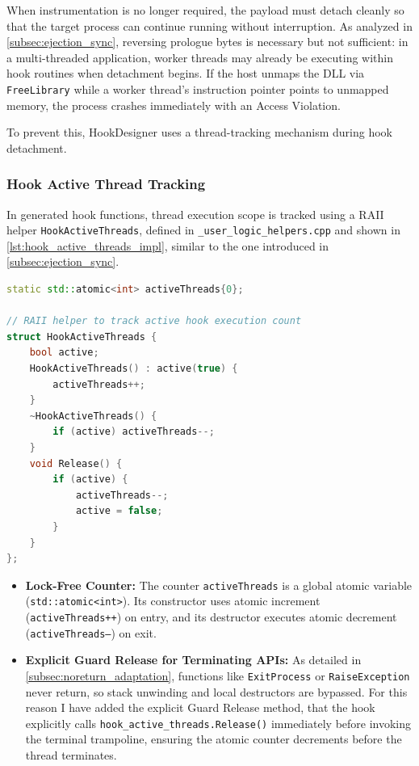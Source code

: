 When instrumentation is no longer required, the payload must detach cleanly so that the target process can continue running without interruption.
As analyzed in \cref{subsec:ejection_sync}, reversing prologue bytes is necessary but not sufficient: in a multi-threaded application, worker threads may already be executing within hook routines when detachment begins.
If the host unmaps the \ac{DLL} via \texttt{FreeLibrary} while a worker thread's instruction pointer points to unmapped memory, the process crashes immediately with an Access Violation.

To prevent this, HookDesigner uses a thread-tracking mechanism during hook detachment.

\subsubsection{Hook Active Thread Tracking}
\label{subsubsec:active_def}

In generated hook functions, thread execution scope is tracked using a RAII helper \texttt{HookActiveThreads}, defined in \texttt{\_user\_logic\_helpers.cpp} and shown in \cref{lst:hook_active_threads_impl}, similar to the one introduced in \cref{subsec:ejection_sync}.

\begin{lstlisting}[language=C++, caption={HookDesigner implementation of active thread tracking in \texttt{\_user\_logic\_helpers.cpp}.}, label={lst:hook_active_threads_impl}, basicstyle=\ttfamily\footnotesize, breaklines=true]
static std::atomic<int> activeThreads{0};

// RAII helper to track active hook execution count
struct HookActiveThreads {
    bool active;
    HookActiveThreads() : active(true) { 
        activeThreads++; 
    }
    ~HookActiveThreads() { 
        if (active) activeThreads--; 
    }
    void Release() {
        if (active) {
            activeThreads--;
            active = false;
        }
    }
};
\end{lstlisting}

\begin{itemize}
	\item \textbf{Lock-Free Counter:} The counter \texttt{activeThreads} is a global atomic variable (\texttt{std::atomic<int>}).
	Its constructor uses atomic increment (\texttt{activeThreads++}) on entry, and its destructor executes atomic decrement (\texttt{activeThreads--}) on exit.
	\item \textbf{Explicit Guard Release for Terminating APIs:}
	As detailed in \cref{subsec:noreturn_adaptation}, functions like \texttt{ExitProcess} or \texttt{RaiseException} never return, so stack unwinding and local destructors are bypassed.
	For this reason I have added the explicit Guard Release method, that the hook explicitly calls \texttt{hook\_active\_threads.Release()} immediately before invoking the terminal trampoline, ensuring the atomic counter decrements before the thread terminates.
\end{itemize}

